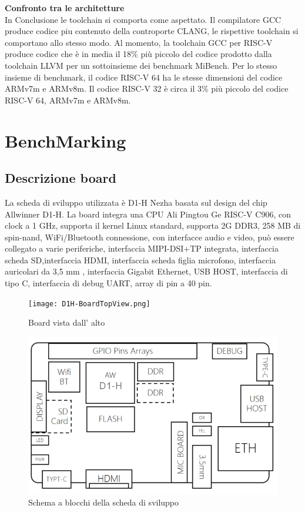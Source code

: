 \documentclass[12pt,a4paper]{report}
\begin{document}
\newpage
\textbf{Confronto tra le architetture}\\
In Conclusione le toolchain si comporta come aspettato. Il compilatore GCC produce codice piu contenuto della controporte CLANG, le rispettive toolchain si comportano allo stesso modo.
Al momento, la toolchain GCC per RISC-V produce codice che è in media il 18\% più piccolo del codice prodotto dalla toolchain LLVM per un sottoinsieme dei benchmark MiBench. Per lo stesso insieme di benchmark, il codice RISC-V 64 ha le stesse dimensioni del codice ARMv7m e ARMv8m. Il codice RISC-V 32 è circa il 3\% più piccolo del codice RISC-V 64, ARMv7m e ARMv8m.



\chapter{BenchMarking}
\section{Descrizione board}

La scheda di sviluppo utilizzata è  D1-H Nezha basata sul design del chip Allwinner D1-H. La board integra una CPU Ali Pingtou Ge RISC-V C906, con clock a 1 GHz, supporta il kernel Linux standard, supporta  2G DDR3, 258 MB di spin-nand, WiFi/Bluetooth connessione, con interfacce audio e video,  può essere collegato a varie periferiche, interfaccia MIPI-DSI+TP integrata, interfaccia scheda SD,interfaccia HDMI, interfaccia scheda figlia microfono, interfaccia auricolari da 3,5 mm , interfaccia Gigabit Ethernet, USB HOST, interfaccia di tipo C, interfaccia di debug UART, array di pin a 40 pin.

\begin{figure}[h!]
\texttt{[image: D1H-BoardTopView.png]}
\caption{Board vista dall' alto}

\includegraphics[width = \textwidth]{D1H-BoardBlockView.png}
\caption{Schema a blocchi della scheda di sviluppo}
\end{figure}
\end{document}
